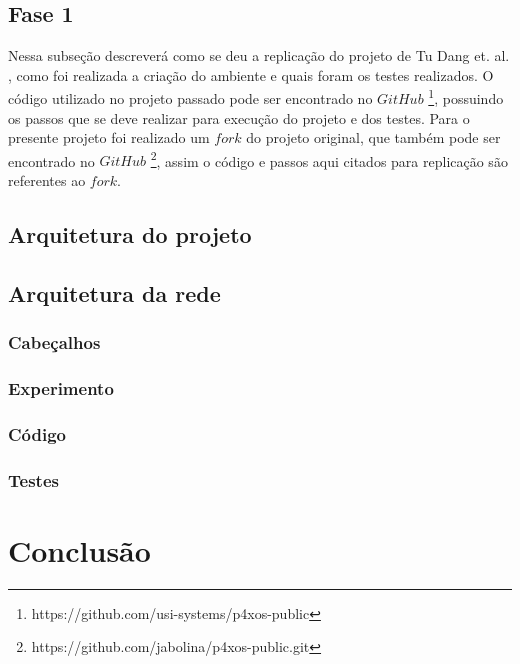 \documentclass[12pt,
openright, 
oneside,
a4paper,
brazil]{facom-ufu-abntex2}
\theoremstyle{definition}
\begin{document}
\subsection{Fase 1}
Nessa subseção descreverá como se deu a replicação do projeto de Tu Dang et. al. 
\citep{dang2016paxos}, como foi realizada a criação do ambiente e quais foram os testes
realizados. O código utilizado no projeto passado pode ser encontrado no $GitHub$
\footnote{https://github.com/usi-systems/p4xos-public}, possuindo os passos que
se deve realizar para execução do projeto e dos testes. Para o presente projeto foi 
realizado um $fork$ do projeto original, que também pode ser encontrado no $GitHub$
\footnote{https://github.com/jabolina/p4xos-public.git}, assim o código e passos aqui
citados para replicação são referentes ao $fork$.
\subsection{Arquitetura do projeto}
\subsection{Arquitetura da rede}
\subsubsection{Cabeçalhos}
\subsubsection{Experimento}
\subsubsection{Código}
\subsubsection{Testes}

\section{Conclusão}





\end{document}
